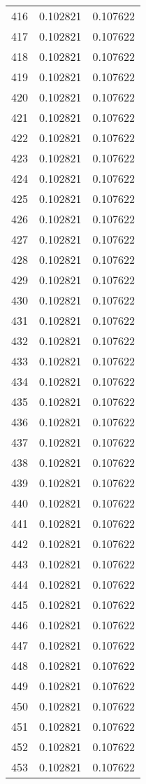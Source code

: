 \begin{longtable}{rrr}
416 & 0.102821 & 0.107622 \\
417 & 0.102821 & 0.107622 \\
418 & 0.102821 & 0.107622 \\
419 & 0.102821 & 0.107622 \\
420 & 0.102821 & 0.107622 \\
421 & 0.102821 & 0.107622 \\
422 & 0.102821 & 0.107622 \\
423 & 0.102821 & 0.107622 \\
424 & 0.102821 & 0.107622 \\
425 & 0.102821 & 0.107622 \\
426 & 0.102821 & 0.107622 \\
427 & 0.102821 & 0.107622 \\
428 & 0.102821 & 0.107622 \\
429 & 0.102821 & 0.107622 \\
430 & 0.102821 & 0.107622 \\
431 & 0.102821 & 0.107622 \\
432 & 0.102821 & 0.107622 \\
433 & 0.102821 & 0.107622 \\
434 & 0.102821 & 0.107622 \\
435 & 0.102821 & 0.107622 \\
436 & 0.102821 & 0.107622 \\
437 & 0.102821 & 0.107622 \\
438 & 0.102821 & 0.107622 \\
439 & 0.102821 & 0.107622 \\
440 & 0.102821 & 0.107622 \\
441 & 0.102821 & 0.107622 \\
442 & 0.102821 & 0.107622 \\
443 & 0.102821 & 0.107622 \\
444 & 0.102821 & 0.107622 \\
445 & 0.102821 & 0.107622 \\
446 & 0.102821 & 0.107622 \\
447 & 0.102821 & 0.107622 \\
448 & 0.102821 & 0.107622 \\
449 & 0.102821 & 0.107622 \\
450 & 0.102821 & 0.107622 \\
451 & 0.102821 & 0.107622 \\
452 & 0.102821 & 0.107622 \\
453 & 0.102821 & 0.107622 \\

\end{longtable}
